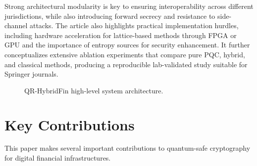 \documentclass[pdflatex,sn-basic,english]{sn-jnl}
\begin{document}
Strong architectural modularity is key to ensuring interoperability across different jurisdictions, while also introducing forward secrecy and resistance to side-channel attacks. The article also highlights practical implementation hurdles, including hardware acceleration for lattice-based methods through FPGA or GPU and the importance of entropy sources for security enhancement. It further conceptualizes extensive ablation experiments that compare pure PQC, hybrid, and classical methods, producing a reproducible lab-validated study suitable for Springer journals.

\begin{figure}[htbp]
\centering
{}
\caption{QR-HybridFin high-level system architecture.}
\label{fig:highlevel}
\end{figure}

\section{Key Contributions}

This paper makes several important contributions to quantum-safe cryptography for digital financial infrastructures.
\end{document}
